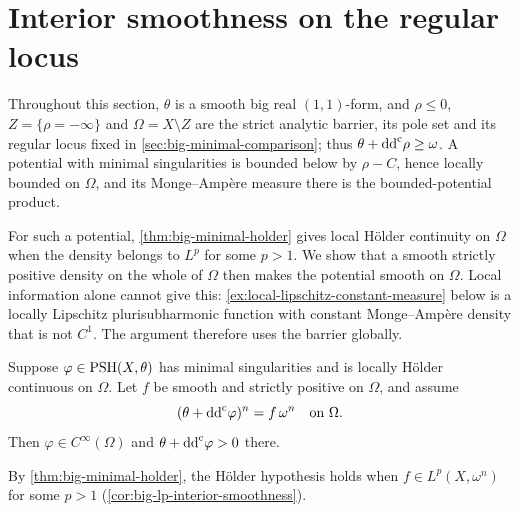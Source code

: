 \section{Interior smoothness on the regular locus}
\label{sec:nonclosed-interior-smoothness}

Throughout this section, $\theta$ is a smooth big real $(1,1)$-form, and $\rho\leq0$, $Z=\{\rho=-\infty\}$ and $\Omega=X\setminus Z$ are the strict analytic barrier, its pole set and its regular locus fixed in \cref{sec:big-minimal-comparison}; thus $\theta+\mathrm{dd}^{\mathrm{c}}\rho\geq\omega$. A potential with minimal singularities is bounded below by $\rho-C$, hence locally bounded on $\Omega$, and its Monge--Amp\`ere measure there is the bounded-potential product.

For such a potential, \cref{thm:big-minimal-holder} gives local H\"older continuity on $\Omega$ when the density belongs to $L^p$ for some $p>1$. We show that a smooth strictly positive density on the whole of $\Omega$ then makes the potential smooth on $\Omega$. Local information alone cannot give this: \cref{ex:local-lipschitz-constant-measure} below is a locally Lipschitz plurisubharmonic function with constant Monge--Amp\`ere density that is not $C^1$. The argument therefore uses the barrier globally.

\begin{theorem}\label{thm:nonclosed-interior-smoothness}
Suppose $\varphi\in\mathrm{PSH}(X,\theta)$ has minimal singularities and is locally
H\"older continuous on $\Omega$. Let $f$ be smooth and strictly positive on $\Omega$, and assume
\[
 (\theta+\mathrm{dd}^{\mathrm{c}}\varphi)^n=f\,\omega^n\quad\text{on }\Omega.
\]
Then
$\varphi\in C^\infty(\Omega)$ and $\theta+\mathrm{dd}^{\mathrm{c}}\varphi>0$ there.
\end{theorem}

By \cref{thm:big-minimal-holder}, the H\"older hypothesis holds when $f\in L^p(X,\omega^n)$ for some $p>1$ (\cref{cor:big-lp-interior-smoothness}).

